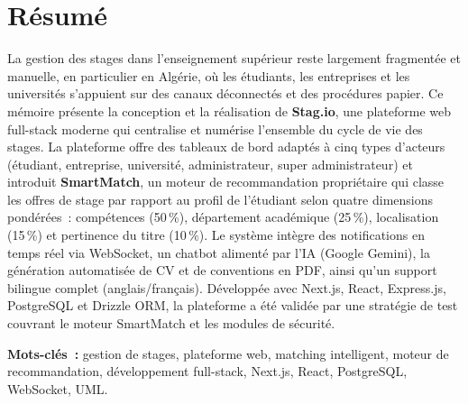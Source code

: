 \chapter*{Résumé}

\vspace{0.3cm}

La gestion des stages dans l'enseignement supérieur reste largement fragmentée et manuelle, en particulier en Algérie, où les étudiants, les entreprises et les universités s'appuient sur des canaux déconnectés et des procédures papier. Ce mémoire présente la conception et la réalisation de \textbf{Stag.io}, une plateforme web full-stack moderne qui centralise et numérise l'ensemble du cycle de vie des stages. La plateforme offre des tableaux de bord adaptés à cinq types d'acteurs (étudiant, entreprise, université, administrateur, super administrateur) et introduit \textbf{SmartMatch}, un moteur de recommandation propriétaire qui classe les offres de stage par rapport au profil de l'étudiant selon quatre dimensions pondérées~: compétences (50\,\%), département académique (25\,\%), localisation (15\,\%) et pertinence du titre (10\,\%). Le système intègre des notifications en temps réel via WebSocket, un chatbot alimenté par l'IA (Google Gemini), la génération automatisée de CV et de conventions en PDF, ainsi qu'un support bilingue complet (anglais/français). Développée avec Next.js, React, Express.js, PostgreSQL et Drizzle ORM, la plateforme a été validée par une stratégie de test couvrant le moteur SmartMatch et les modules de sécurité.

\vspace{0.8cm}

\textbf{Mots-clés~:} gestion de stages, plateforme web, matching intelligent, moteur de recommandation, développement full-stack, Next.js, React, PostgreSQL, WebSocket, UML.
